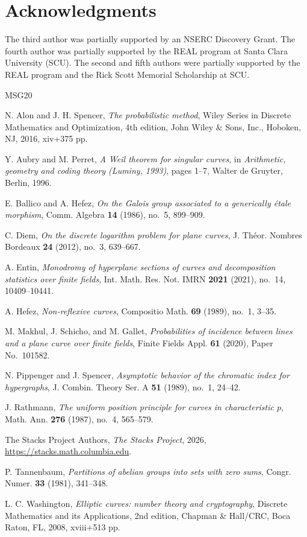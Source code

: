 \documentclass[10pt,a4paper]{amsart}
\theoremstyle{definition}
\theoremstyle{remark}
\begin{document}
\section*{Acknowledgments}
The third author was partially supported by an NSERC Discovery Grant. The fourth author was partially supported by the REAL program at Santa Clara University (SCU). The second and fifth authors were partially supported by the REAL program and the Rick Scott Memorial Scholarship at SCU.

\begin{thebibliography}{MSG20}

N. Alon and J. H. Spencer, \emph{The probabilistic method}, Wiley Series in Discrete Mathematics and Optimization, 4th edition, John Wiley \& Sons, Inc., Hoboken, NJ, 2016, xiv+375 pp.

Y. Aubry and M. Perret, \emph{A {W}eil theorem for singular curves}, in \emph{Arithmetic, geometry and coding theory ({L}uminy, 1993)}, pages 1--7, Walter de Gruyter, Berlin, 1996.

E. Ballico and A. Hefez, \emph{On the Galois group associated
to a generically \'etale morphism}, Comm. Algebra
\textbf{14} (1986), no.~5, 899--909.

C. Diem, \emph{On the discrete logarithm problem for plane curves}, J. Th\'eor. Nombres Bordeaux \textbf{24} (2012), no.~3, 639--667.

A. Entin, \emph{Monodromy of hyperplane sections of curves and decomposition statistics over finite fields}, Int. Math. Res. Not. IMRN \textbf{2021} (2021), no.~14, 10409--10441.

A. Hefez, \emph{Non-reflexive curves}, Compositio Math. \textbf{69} (1989), no.~1, 3--35.

M. Makhul, J. Schicho, and M. Gallet, \emph{Probabilities of incidence between lines and a plane curve over finite fields}, Finite Fields Appl. \textbf{61} (2020), Paper No.~101582.

N. Pippenger and J. Spencer, \emph{Asymptotic behavior of the chromatic index for hypergraphs}, J. Combin. Theory Ser. A \textbf{51} (1989), no.~1, 24--42.

J. Rathmann, \emph{The uniform position principle for curves
in characteristic $p$}, Math. Ann. \textbf{276} (1987),
no.~4, 565--579.

The Stacks Project Authors, \emph{The Stacks Project},
2026, \url{https://stacks.math.columbia.edu}.

P. Tannenbaum, \emph{Partitions of abelian groups into sets with zero sums}, Congr. Numer. \textbf{33} (1981), 341--348.

L. C. Washington, \emph{Elliptic curves: number theory and cryptography}, Discrete Mathematics and its Applications, 2nd edition, Chapman \& Hall/CRC, Boca Raton, FL, 2008, xviii+513 pp.


\end{thebibliography}
\end{document}
